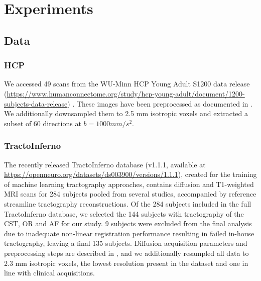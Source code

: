 \chapter{Experiments}
\label{}


\section{Data}
\label{sec:data}



\subsection{HCP}

We accessed 49 scans from the WU-Minn HCP Young Adult S1200 data release (\url{https://www.humanconnectome.org/study/hcp-young-adult/document/1200-subjects-data-release}) \autocite{VanEssen2013}.
These images have been preprocessed as documented in \textcite{Glasser2013}.
We additionally downsampled them to 2.5 mm isotropic voxels and extracted a subset of 60 directions at $b=1000 mm/s^2$.

\subsection{TractoInferno}

The recently released TractoInferno database (v1.1.1, available at \url{https://openneuro.org/datasets/ds003900/versions/1.1.1}),\autocite{Poulin2022} created for the training of machine learning tractography approaches, contains diffusion and T1-weighted MRI scans for 284 subjects pooled from several studies, accompanied by reference streamline tractography reconstructions.
Of the 284 subjects included in the full TractoInferno database, we selected the 144 subjects with tractography of the CST, OR and AF for our study.
9 subjects were excluded from the final analysis due to inadequate non-linear registration performance resulting in failed in-house tractography, leaving a final 135 subjects.
Diffusion acquisition parameters and preprocessing steps are described in \textcite{Poulin2022}, and we additionally resampled all data to 2.3 mm isotropic voxels, the lowest resolution present in the dataset and one in line with clinical acquisitions.

